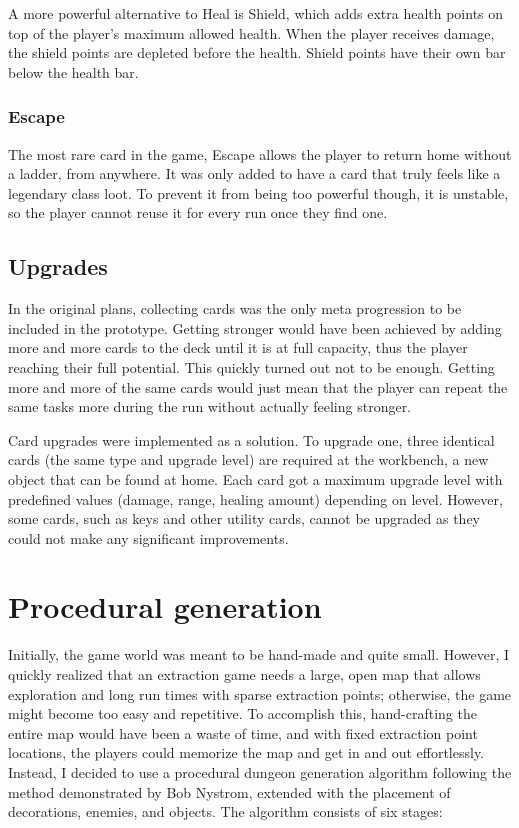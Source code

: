 A more powerful alternative to Heal is Shield, which adds extra health points on top of the player's maximum allowed health. When the player receives damage, the shield points are depleted before the health. Shield points have their own bar below the health bar.



\subsubsection{Escape}

The most rare card in the game, Escape allows the player to return home without a ladder, from anywhere. It was only added to have a card that truly feels like a legendary class loot. To prevent it from being too powerful though, it is unstable, so the player cannot reuse it for every run once they find one.



\subsection{Upgrades}

In the original plans, collecting cards was the only meta progression to be included in the prototype. Getting stronger would have been achieved by adding more and more cards to the deck until it is at full capacity, thus the player reaching their full potential. This quickly turned out not to be enough. Getting more and more of the same cards would just mean that the player can repeat the same tasks more during the run without actually feeling stronger.

Card upgrades were implemented as a solution. To upgrade one, three identical cards (the same type and upgrade level) are required at the workbench, a new object that can be found at home. Each card got a maximum upgrade level with predefined values (damage, range, healing amount) depending on level. However, some cards, such as keys and other utility cards, cannot be upgraded as they could not make any significant improvements.



\section{Procedural generation} \label{Section:ProceduralGeneration}

Initially, the game world was meant to be hand-made and quite small. However, I quickly realized that an extraction game needs a large, open map that allows exploration and long run times with sparse extraction points; otherwise, the game might become too easy and repetitive. To accomplish this, hand-crafting the entire map would have been a waste of time, and with fixed extraction point locations, the players could memorize the map and get in and out effortlessly. Instead, I decided to use a procedural dungeon generation algorithm following the method demonstrated by Bob Nystrom\cite{nystromProcedural2014}, extended with the placement of decorations, enemies, and objects. The algorithm consists of six stages:

